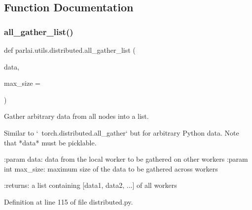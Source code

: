 \subsection{Function Documentation}
\mbox{\label{namespaceparlai_1_1utils_1_1distributed_a9ef5bf0debf512ddbeb045327bfd87ef}} 
\subsubsection{\texorpdfstring{all\+\_\+gather\+\_\+list()}{all\_gather\_list()}}
{\footnotesize\ttfamily def parlai.\+utils.\+distributed.\+all\+\_\+gather\+\_\+list (\begin{DoxyParamCaption}\item[{}]{data,  }\item[{}]{max\+\_\+size = {} }\end{DoxyParamCaption})}

\begin{DoxyVerb}Gather arbitrary data from all nodes into a list.

Similar to `~torch.distributed.all_gather` but for arbitrary Python
data. Note that *data* must be picklable.

:param data:
    data from the local worker to be gathered on other workers
:param int max_size:
    maximum size of the data to be gathered across workers

:returns:
    a list containing [data1, data2, ...] of all workers
\end{DoxyVerb}
 

Definition at line 115 of file distributed.\+py.


